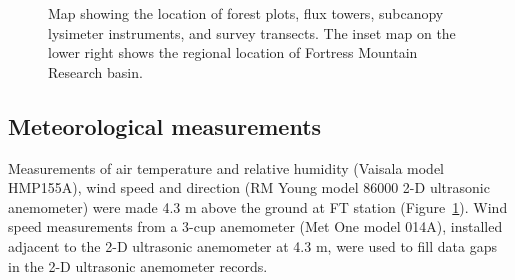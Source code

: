 \documentclass[
  letterpaper,
  DIV=11,
  numbers=noendperiod]{scrartcl}
\begin{document}
\begin{figure}[H]


\caption{\label{fig-site-map}Map showing the location of forest plots,
flux towers, subcanopy lysimeter instruments, and survey transects. The
inset map on the lower right shows the regional location of Fortress
Mountain Research basin.}

\end{figure}%

\subsection{Meteorological
measurements}\label{meteorological-measurements}

Measurements of air temperature and relative humidity (Vaisala model
HMP155A), wind speed and direction (RM Young model 86000 2-D ultrasonic
anemometer) were made 4.3 m above the ground at FT station
(Figure~\ref{fig-site-map}). Wind speed measurements from a 3-cup
anemometer (Met One model 014A), installed adjacent to the 2-D
ultrasonic anemometer at 4.3 m, were used to fill data gaps in the 2-D
ultrasonic anemometer records.
\end{document}
